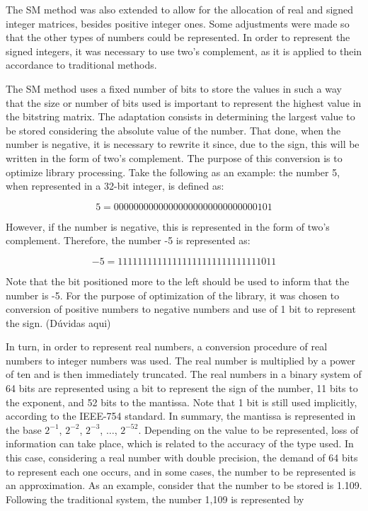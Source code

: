 \documentclass[10pt]{article}
\begin{document}
The SM method was also extended to allow for the allocation of real and 
signed integer matrices, besides positive integer ones. Some adjustments were 
made so that the other types of numbers could be represented. In order to 
represent the signed integers, it was necessary to use two's complement, as it 
is applied to thein accordance to traditional methods. 

The SM method uses a fixed number of bits to store the values in such a way that
the size or number of bits used is important to represent the highest value in 
the bitstring matrix. The adaptation 
consists in determining the largest value to be stored considering the absolute 
value of the number. That done,
when the number is negative, it is necessary to rewrite it since, due to the 
sign, this will be written in the form of 
two's complement. The purpose of this conversion is to optimize library 
processing. Take the following as an example: 
the number 5, when represented in a 32-bit integer, is defined as:

\begin{equation}\nonumber
 5 = 00000000 00000000 00000000 00000101
\end{equation}

However, if the number is negative, this is represented in the form of two's 
complement. Therefore, the number -5 is 
represented as:

\begin{equation}\nonumber
 -5 = 11111111 11111111 11111111 11111011
\end{equation}

Note that the bit positioned more to the left should be used to inform that the 
number is -5. For the purpose of 
optimization of the library, it was chosen to conversion of positive numbers to 
negative numbers and use of 1 
bit to represent the sign. (Dúvidas aqui)

In turn, in order to represent real numbers, a conversion procedure of real 
numbers to integer numbers was used. The 
real number is multiplied by a power of ten and is then immediately truncated. 
The real numbers in a binary system of 64 
bits are represented using a bit to represent the sign of the number, 11 bits to 
the exponent, and 52 bits to the 
mantissa. Note that 1 bit is still used implicitly, according to the IEEE-754 
standard. In summary, the mantissa is 
represented in the base $2^{-1}$, $2^{-2}$, $2^{-3}$, $\hdots$, $2^{-52}$. 
Depending on the value to be represented, 
loss of information can take place, which is related to the accuracy of the type 
used. In this case, considering a real 
number with double precision, the demand of 64 bits to represent each one 
occurs, and in some cases, the number to be 
represented is an approximation. As an example, consider that the number to be 
stored is 1.109. Following the 
traditional system, the number 1,109 is represented by
\end{document}
